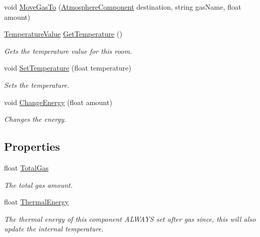 \begin{DoxyCompactItemize}
void \hyperlink{class_atmosphere_component_a5344325e734a5b8c1064bf23efa15f03}{Move\+Gas\+To} (\hyperlink{class_atmosphere_component}{Atmosphere\+Component} destination, string gas\+Name, float amount)
\item 
\hyperlink{struct_temperature_value}{Temperature\+Value} \hyperlink{class_atmosphere_component_a46943e800a2c308b26728a7cbc4b8f71}{Get\+Temperature} ()
\begin{DoxyCompactList}\small\item\em Gets the temperature value for this room. \end{DoxyCompactList}\item 
void \hyperlink{class_atmosphere_component_a5bfd247451db89bb03bbd4f8d2adc258}{Set\+Temperature} (float temperature)
\begin{DoxyCompactList}\small\item\em Sets the temperature. \end{DoxyCompactList}\item 
void \hyperlink{class_atmosphere_component_a00e0f048f19f2fd4c93cd4b4958c26c3}{Change\+Energy} (float amount)
\begin{DoxyCompactList}\small\item\em Changes the energy. \end{DoxyCompactList}\end{DoxyCompactItemize}
\subsection*{Properties}
\begin{DoxyCompactItemize}
\item 
float \hyperlink{class_atmosphere_component_a36f398bb1cc5031be7309cc06de32ad0}{Total\+Gas}
\begin{DoxyCompactList}\small\item\em The total gas amount. \end{DoxyCompactList}\item 
float \hyperlink{class_atmosphere_component_aefa5aa1258c50b53eb78be9bf0750cbd}{Thermal\+Energy}
\begin{DoxyCompactList}\small\item\em The thermal energy of this component A\+L\+W\+A\+YS set after gas since, this will also update the internal temperature. \end{DoxyCompactList}\end{DoxyCompactItemize}


